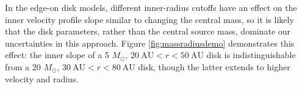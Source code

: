 \documentclass[twocolumn]{aastex61}
\newcommand{\msun}{\ensuremath{M_{\odot}}\xspace}			%
\begin{document}

In the edge-on disk models, different inner-radius cutoffs have an effect on
the inner velocity profile slope similar to changing the central mass, so it is
likely that the disk parameters, rather than the central source mass, dominate
our uncertainties in this approach.  
Figure \ref{fig:massradiusdemo} demonstrates this effect: the inner slope of
a 5 \msun, $20~\mathrm{AU} < r < 50~\mathrm{AU}$ disk is indistinguishable
from a 20 \msun , $30~\mathrm{AU} < r < 80~\mathrm{AU}$ disk, though the latter
extends to higher velocity and radius.

\end{document}
